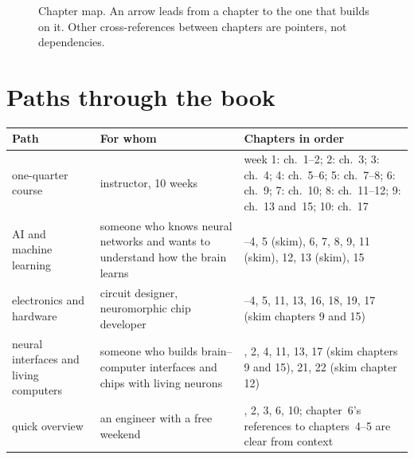 \begin{figure}[h]
\caption{Chapter map. An arrow leads from a chapter to the one that builds on it. Other cross-references between chapters are pointers, not dependencies.}
\label{fig:roadmap}
\end{figure}

\section*{Paths through the book}

\begin{center}
\footnotesize
\setlength{\tabcolsep}{4pt}
\renewcommand{\arraystretch}{1.2}
\begin{tabular}{>{\raggedright}p{3.0cm}>{\raggedright}p{3.9cm}>{\raggedright\arraybackslash}p{6.4cm}}
\toprule
Path & For whom & Chapters in order \\
\midrule
one-quarter course & instructor, 10 weeks & week 1: ch.~1--2; 2: ch.~3; 3: ch.~4; 4: ch.~5--6; 5: ch.~7--8; 6: ch.~9; 7: ch.~10; 8: ch.~11--12; 9: ch.~13 and~15; 10: ch.~17 \\
AI and machine learning & someone who knows neural networks and wants to understand how the brain learns & 1--4, 5 (skim), 6, 7, 8, 9, 11 (skim), 12, 13 (skim), 15 \\
electronics and hardware & circuit designer, neuromorphic chip developer & 1--4, 5, 11, 13, 16, 18, 19, 17 (skim chapters 9 and 15) \\
neural interfaces and living computers & someone who builds brain--computer interfaces and chips with living neurons & 1, 2, 4, 11, 13, 17 (skim chapters 9 and 15), 21, 22 (skim chapter 12) \\
quick overview & an engineer with a free weekend & 1, 2, 3, 6, 10; chapter~6's references to chapters~4--5 are clear from context \\
\bottomrule
\end{tabular}
\end{center}

